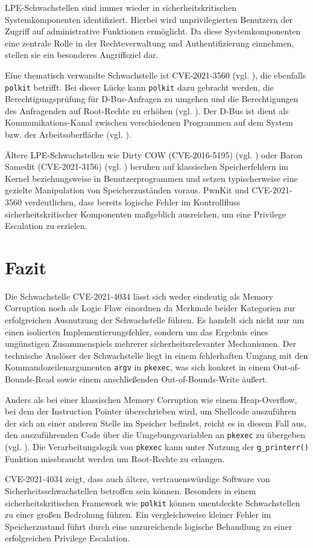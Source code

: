 \documentclass[oneside,11pt,a4paper,article,german]{memoir}
\begin{document}
LPE-Schwachstellen sind immer wieder in sicherheitskritischen
Systemkomponenten identifiziert. Hierbei wird unprivilegierten Benutzern der Zugriff
auf administrative Funktionen ermöglicht. Da diese Systemkomponenten eine
zentrale Rolle in der Rechteverwaltung und Authentifizierung einnehmen, stellen
sie ein besonderes Angriffsziel dar.
\par
Eine thematisch verwandte Schwachstelle ist CVE-2021-3560
(vgl. \cite{c22_cve_2021_3560_redhat}), die ebenfalls \texttt{polkit} betrifft. Bei dieser Lücke kann \texttt{polkit}
dazu gebracht werden, die Berechtigungsprüfung für D-Bus-Anfragen zu umgehen
und die Berechtigungen des Anfragenden auf Root-Rechte zu erhöhen (vgl. \cite{n14_nist_cve2021_3560}).
Der D-Bus ist dient als Kommunikations-Kanal zwischen verschiedenen Programmen
auf dem System bzw. der Arbeitsoberfläche (vgl. \cite{n15_ubuntuusers_dbus}).
\par
Ältere LPE-Schwachstellen wie Dirty COW (CVE-2016-5195)
(vgl. \cite{c23_cve_2016_5195}) oder Baron Samedit (CVE-2021-3156) (vgl. \cite{c24_cve_2021_3156}) beruhen auf klassischen
Speicherfehlern im Kernel beziehungsweise in Benutzerprogrammen und setzen
typischerweise eine gezielte Manipulation von Speicherzuständen voraus. PwnKit
und CVE-2021-3560 verdeutlichen, dass bereits logische Fehler im Kontrollfluss
sicherheitskritischer Komponenten maßgeblich ausreichen, um eine Privilege
Escalation zu erzielen.

\chapter{Fazit}

Die Schwachstelle CVE-2021-4034 lässt sich weder eindeutig als
Memory Corruption noch als Logic Flaw einordnen da Merkmale beider Kategorien
zur erfolgreichen Ausnutzung der Schwachstelle führen. Es handelt sich nicht
nur um einen isolierten Implementierungsfehler, sondern um das Ergebnis eines
ungünstigen Zusammenspiels mehrerer sicherheitsrelevanter Mechanismen. Der
technische Auslöser der Schwachstelle liegt in einem fehlerhaften Umgang mit
den Kommandozeilenargumenten \texttt{argv} in \texttt{pkexec}, was sich konkret
in einem Out-of-Bounds-Read sowie einem anschließenden Out-of-Bounds-Write äußert.
\par
Anders als bei einer klassischen Memory Corruption wie einem
Heap-Overflow, bei dem der Instruction Pointer überschrieben wird, um Shellcode
auszuführen der sich an einer anderen Stelle im Speicher befindet, reicht es in
diesem Fall aus, den auszuführenden Code über die Umgebungsvariablen an \texttt{pkexec}
zu übergeben (vgl. \cite{n13_sysdig_cve2021_4034}). Die Verarbeitungslogik von \texttt{pkexec}
kann unter Nutzung der \texttt{g\_printerr()} Funktion missbraucht werden um Root-Rechte zu erlangen.
\par
CVE-2021-4034 zeigt, dass auch ältere, vertrauenswürdige
Software von Sicherheitsschwachstellen betroffen sein können. Besonders in
einem sicherheitskritischen Framework wie \texttt{polkit} können unentdeckte
Schwachstellen zu einer großen Bedrohung führen. Ein vergleichsweise kleiner
Fehler im Speicherzustand führt durch eine unzureichende logische Behandlung zu
einer erfolgreichen Privilege Escalation.

\newpage

\printbibliography
\end{document}
